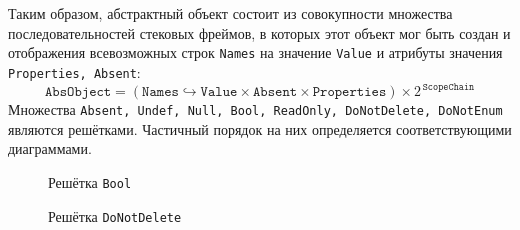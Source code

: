 
Таким образом, абстрактный объект состоит из совокупности множества
последовательностей стековых фреймов, в которых этот объект мог быть
создан и отображения всевозможных строк \texttt{Names} на значение
\texttt{Value} и атрибуты значения \texttt{Properties, Absent}:
\[
  \mathtt{AbsObject} = \left( 
      \mathtt{Names} \hookrightarrow \mathtt{Value} 
      \times \mathtt{Absent} 
      \times \mathtt{Properties} 
    \right) \times 2^{\,\mathtt{ScopeChain}}
\]%
Множества
\texttt{Absent, Undef, Null, Bool, ReadOnly, DoNotDelete, DoNotEnum}
являются решётками. Частичный порядок на них определяется
соответствующими диаграммами.
\begin{figure}[htp]
\centering
{}
\caption{Решётка \texttt{Bool}}
\label{fig:bool}
\end{figure}%
\begin{figure}[htp]
\centering
{}
\caption{Решётка \texttt{DoNotDelete}}
\label{fig:dnd}
\end{figure}%
